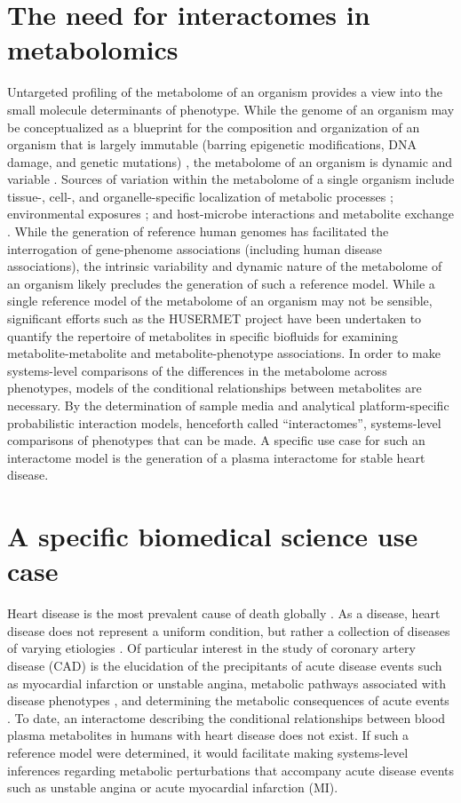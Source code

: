\begin{DoubleSpace*}
\section{The need for interactomes in metabolomics}
Untargeted profiling of the metabolome of an organism provides a view into the small molecule determinants of phenotype. While the genome of an organism may be conceptualized as a blueprint for the composition and organization of an organism that is largely immutable (barring epigenetic modifications, DNA damage, and genetic mutations) \cite{gao2015,keating2015,martincorena2015}, the metabolome of an organism is dynamic and variable \cite{dallmann2012,krycer2017}. Sources of variation within the metabolome of a single organism include tissue-, cell-, and organelle-specific localization of metabolic processes \cite{shlomi2008,voet2013}; environmental exposures \cite{southam2014}; and host-microbe interactions and metabolite exchange \cite{moriya2017}. While the generation of reference human genomes has facilitated the interrogation of gene-phenome associations (including human disease associations), the intrinsic variability and dynamic nature of the metabolome of an organism likely precludes the generation of such a reference model. While a single reference model of the metabolome of an organism may not be sensible, significant efforts such as the HUSERMET project \cite{dunn2014} have been undertaken to quantify the repertoire of metabolites in specific biofluids for examining metabolite-metabolite and metabolite-phenotype associations. In order to make systems-level comparisons of the differences in the metabolome across phenotypes, models of the conditional relationships between metabolites are necessary. By the determination of sample media and analytical platform-specific probabilistic interaction models, henceforth called ``interactomes'', systems-level comparisons of phenotypes that can be made. A specific use case for such an interactome model is the generation of a plasma interactome for stable heart disease.

\section{A specific biomedical science use case}
Heart disease is the most prevalent cause of death globally \cite{benjamin2017}. As a disease, heart disease does not represent a uniform condition, but rather a collection of diseases of varying etiologies \cite{kasper2015}. Of particular interest in the study of coronary artery disease (CAD) is the elucidation of the precipitants of acute disease events such as myocardial infarction \cite{arbab2015} or unstable angina, metabolic pathways associated with disease phenotypes \cite{fan2016}, and determining the metabolic consequences of acute events \cite{trainor2017}. To date, an interactome describing the conditional relationships between blood plasma metabolites in humans with heart disease does not exist. If such a reference model were determined, it would facilitate making systems-level inferences regarding metabolic perturbations that accompany acute disease events such as unstable angina or acute myocardial infarction (MI).


\end{DoubleSpace*}
